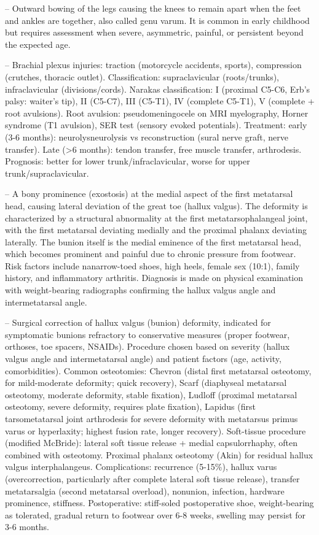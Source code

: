 -- Outward bowing of the legs causing the knees to remain apart when the feet and ankles are together, also called genu varum. It is common in early childhood but requires assessment when severe, asymmetric, painful, or persistent beyond the expected age.

-- Brachial plexus injuries: traction (motorcycle accidents, sports), compression (crutches, thoracic outlet). Classification: supraclavicular (roots/trunks), infraclavicular (divisions/cords). Narakas classification: I (proximal C5-C6, Erb's palsy: waiter's tip), II (C5-C7), III (C5-T1), IV (complete C5-T1), V (complete + root avulsions). Root avulsion: pseudomeningocele on MRI myelography, Horner syndrome (T1 avulsion), SER test (sensory evoked potentials). Treatment: early (3-6 months): neurolysneurolysis vs reconstruction (sural nerve graft, nerve transfer). Late (>6 months): tendon transfer, free muscle transfer, arthrodesis. Prognosis: better for lower trunk/infraclavicular, worse for upper trunk/supraclavicular.

-- A bony prominence (exostosis) at the medial aspect of the first metatarsal head, causing lateral deviation of the great toe (hallux valgus). The deformity is characterized by a structural abnormality at the first metatarsophalangeal joint, with the first metatarsal deviating medially and the proximal phalanx deviating laterally. The bunion itself is the medial eminence of the first metatarsal head, which becomes prominent and painful due to chronic pressure from footwear. Risk factors include nanarrow-toed shoes, high heels, female sex (10:1), family history, and inflammatory arthritis. Diagnosis is made on physical examination with weight-bearing radiographs confirming the hallux valgus angle and intermetatarsal angle.

-- Surgical correction of hallux valgus (bunion) deformity, indicated for symptomatic bunions refractory to conservative measures (proper footwear, orthoses, toe spacers, NSAIDs). Procedure chosen based on severity (hallux valgus angle and intermetatarsal angle) and patient factors (age, activity, comorbidities). Common osteotomies: Chevron (distal first metatarsal osteotomy, for mild-moderate deformity; quick recovery), Scarf (diaphyseal metatarsal osteotomy, moderate deformity, stable fixation), Ludloff (proximal metatarsal osteotomy, severe deformity, requires plate fixation), Lapidus (first tarsometatarsal joint arthrodesis for severe deformity with metatarsus primus varus or hyperlaxity; highest fusion rate, longer recovery). Soft-tissue procedure (modified McBride): lateral soft tissue release + medial capsulorrhaphy, often combined with osteotomy. Proximal phalanx osteotomy (Akin) for residual hallux valgus interphalangeus. Complications: recurrence (5-15\%), hallux varus (overcorrection, particularly after complete lateral soft tissue release), transfer metatarsalgia (second metatarsal overload), nonunion, infection, hardware prominence, stiffness. Postoperative: stiff-soled postoperative shoe, weight-bearing as tolerated, gradual return to footwear over 6-8 weeks, swelling may persist for 3-6 months.

